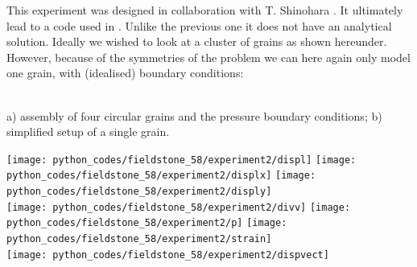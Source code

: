 This experiment was designed in collaboration with T. Shinohara .
It ultimately lead to a code used in \textcite{shts25}. 
Unlike the previous one it does not have an analytical solution. Ideally we wished to look at a 
cluster of grains as shown hereunder. However, because of the symmetries of the problem we can 
here again only model one grain, with (idealised) boundary conditions:
 
\begin{center}
\\
{\captionfont a) assembly of four circular grains and the pressure boundary conditions; 
b) simplified setup of a single grain.}
\end{center}

\begin{center}
\texttt{[image: python\_codes/fieldstone\_58/experiment2/displ]}
\texttt{[image: python\_codes/fieldstone\_58/experiment2/displx]}
\texttt{[image: python\_codes/fieldstone\_58/experiment2/disply]}\\
\texttt{[image: python\_codes/fieldstone\_58/experiment2/divv]}
\texttt{[image: python\_codes/fieldstone\_58/experiment2/p]}
\texttt{[image: python\_codes/fieldstone\_58/experiment2/strain]}\\
\texttt{[image: python\_codes/fieldstone\_58/experiment2/dispvect]}
\end{center}



